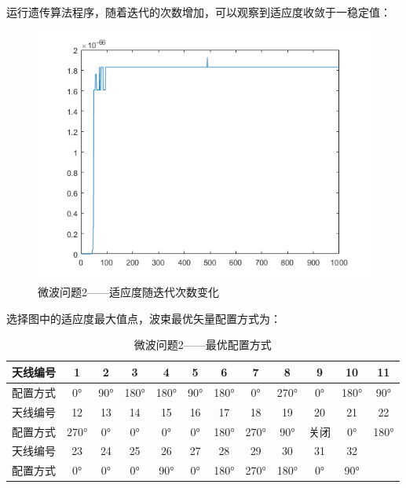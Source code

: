 \documentclass[UTF8,12pt]{ctexart}
\begin{document}
        运行遗传算法程序，随着迭代的次数增加，可以观察到适应度收敛于一稳定值：
        \begin{figure}[H]
            \centering
            \includegraphics[scale=0.7]{lian2.png}
            \caption{微波问题2——适应度随迭代次数变化}
            \end{figure}
        选择图中的适应度最大值点，波束最优矢量配置方式为：
      \begin{table}[htbp]
        \centering
        \caption{微波问题2——最优配置方式}
          \begin{tabular}{cccccccccccc}
          \toprule
          天线编号   & 1      & 2      & 3      & 4      & 5      & 6      & 7      & 8      & 9      & 10     & 11 \\
          \midrule
          配置方式   & 0°     & 90°    & 180°   & 180°   & 90°    & 180°   & 0°     & 270°   & 0°     & 180°   & 90° \\
          \midrule
          天线编号   & 12     & 13     & 14     & 15     & 16     & 17     & 18     & 19     & 20     & 21     & 22 \\
          \midrule
          配置方式   & 270°   & 0°     & 0°     & 0°     & 0°     & 180°   & 270°   & 90°    & 关闭     & 0°     & 180° \\
          \midrule
          天线编号   & 23     & 24     & 25     & 26     & 27     & 28     & 29     & 30     & 31     & 32     &  \\
          \midrule
          配置方式   & 0°     & 0°     & 0°     & 90°    & 0°     & 180°   & 270°   & 180°   & 0°     & 90°    &  \\
          \bottomrule
          \end{tabular}%
        \label{tab:addlabel}%
      \end{table}%
\end{document}

